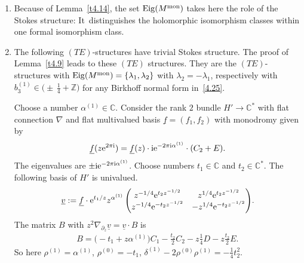 \documentclass[pdftex]{sigma}%
\numberwithin{equation}{section}
\numberwithin{figure}{section}
\newcommand{\Z}{{\mathbb Z}}
\newcommand{\C}{{\mathbb C}}
\newcommand{\uuuu}{\underline}
\newcommand{\paa}{\partial}
\newcommand{\nnn}{\nabla}
\DeclareMathOperator{\Eig}{Eig}
\begin{document}
\begin{Remarks}\qquad%
\begin{enumerate}\itemsep=0pt
\item[$(i)$] Because of Lemma~\ref{t4.14}, the set $\Eig(M^{\rm mon})$
takes here the role of the Stokes structure: It~distinguishes the
holomorphic isomorphism classes within one formal
isomorphism class.

\item[$(ii)$] The following $(TE)$-structures
have trivial Stokes structure.
The proof of Lemma~\ref{t4.9} leads to these $(TE)$ structures. They are the $(TE)$-structures
with $\Eig(M^{\rm mon})=\{\lambda_1,\lambda_2\}$
with $\lambda_2=-\lambda_1$,
respectively with $b_3^{(1)}\in\big({\pm}\,\frac{1}{4}+\Z\big)$
for any Birkhoff normal form in~\eqref{4.25}.

Choose a number $\alpha^{(1)}\in\C$.
Consider the rank $2$ bundle $H'\to\C^*$ with flat
connection $\nnn$ and flat multivalued basis
$\uuuu{f}=(f_1,f_2)$ with monodromy given by
\begin{gather*}%
\uuuu{f}(z{\rm e}^{2\pi {\rm i}})=\uuuu{f}(z)\cdot {\rm i}{\rm e}^{-2\pi {\rm i}\alpha^{(1)}}
\cdot (C_2+E).
\end{gather*}
The eigenvalues are $\pm {\rm i}{\rm e}^{-2\pi {\rm i}\alpha^{(1)}}$.
Choose numbers $t_1\in\C$ and $t_2\in\C^*$.
The following basis of $H'$ is univalued.
\begin{eqnarray}\label{4.43}
\uuuu{v}:= \uuuu{f}\cdot {\rm e}^{t_1/z}z^{\alpha^{(1)}}
\begin{pmatrix}z^{-1/4}{\rm e}^{t_2z^{-1/2}}
& z^{1/4}{\rm e}^{t_2z^{-1/2}}\\
z^{-1/4}{\rm e}^{-t_2z^{-1/2}}
&-z^{1/4}{\rm e}^{-t_2z^{-1/2}}
\end{pmatrix}\!.
\end{eqnarray}
The matrix $B$ with
$z^2\nnn_{\paa_z}\uuuu{v}=\uuuu{v}\cdot B$ is
\begin{gather}\label{4.44}
B= \big({-}t_1+z\alpha^{(1)}\big)C_1-\frac{t_2}{2} C_2
-z\frac{1}{4}D-z\frac{t_2}{2}E.
\end{gather}
So here $\rho^{(1)}=\alpha^{(1)}$, $\rho^{(0)}=-t_1$,
$\delta^{(1)}-2\rho^{(0)}\rho^{(1)}=-\frac{1}{4}t_2^2$.


\end{enumerate}
\end{Remarks}
\end{document}
